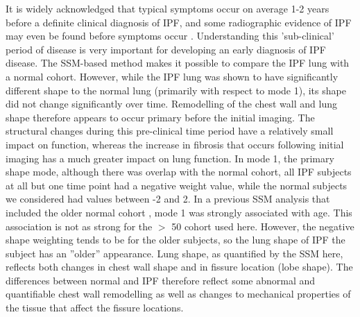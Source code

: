 It is widely acknowledged that typical symptoms occur on average 1-2 years before a definite clinical diagnosis of IPF, and some radiographic evidence of IPF may even be found before symptoms occur \citep{raghu2011official, devaraj2014imaging}. Understanding this 'sub-clinical' period of disease is very important for developing an early diagnosis of IPF disease. The SSM-based method makes it possible to compare the IPF lung with a normal cohort. However, while the IPF lung was shown to have significantly different shape to the normal lung (primarily with respect to mode 1), its shape did not change significantly over time. Remodelling of the chest wall and lung shape therefore appears to occur primary before the initial imaging. The structural changes during this pre-clinical time period have a relatively small impact on function, whereas the increase in fibrosis that occurs following initial imaging has a much greater impact on lung function. In mode 1, the primary shape mode, although there was overlap with the normal cohort, all IPF subjects at all but one time point had a negative weight value, while the normal subjects we considered had values between -2 and 2. In a previous SSM analysis that included the older normal cohort \citep{Osanlouy2018Statistical}, mode 1 was strongly associated with age. This association is not as strong for the $>$ 50 cohort used here. However, the negative shape weighting tends to be for the older subjects, so the lung shape of IPF the subject has an ''older'' appearance. Lung shape, as quantified by the SSM here, reflects both changes in chest wall shape and in fissure location (lobe shape). The differences between normal and IPF therefore reflect some abnormal and quantifiable chest wall remodelling as well as changes to mechanical properties of the tissue that affect the fissure locations.



